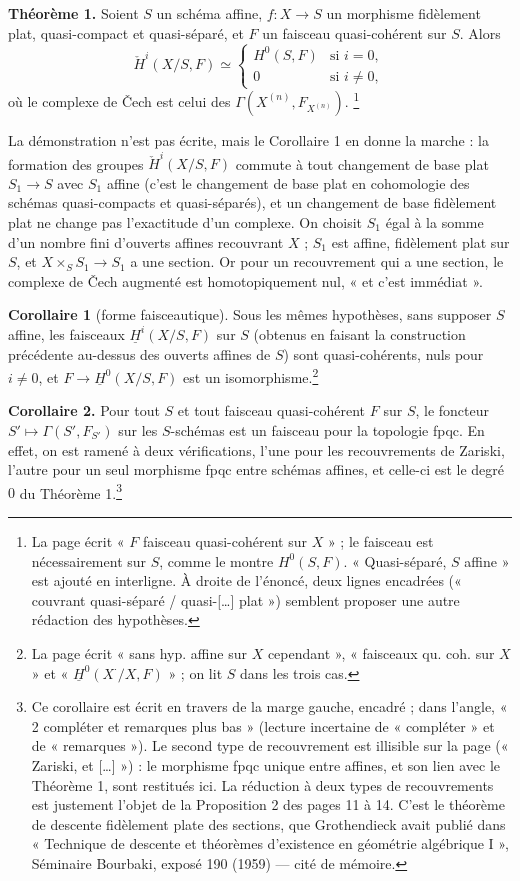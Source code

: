 \documentclass[11pt,a4paper]{article}
\begin{document}
\textbf{Théorème 1.} Soient $S$ un schéma affine, $f : X \to S$ un morphisme
fidèlement plat, quasi-compact et quasi-séparé, et $F$ un faisceau
quasi-cohérent sur $S$. Alors
\[
  \check{H}^i(X/S, F) \simeq
  \begin{cases}
    H^0(S, F) & \text{si } i = 0, \\
    0 & \text{si } i \neq 0 ,
  \end{cases}
\]
où le complexe de Čech est celui des $\Gamma(X^{(n)}, F_{X^{(n)}})$.%
\footnote{La page écrit « $F$ faisceau quasi-cohérent sur $X$ » ; le
faisceau est nécessairement sur $S$, comme le montre $H^0(S, F)$. « Quasi-séparé, $S$ affine » est ajouté en interligne. À droite de
l'énoncé, deux lignes encadrées (« couvrant quasi-séparé / quasi-[…] plat »)
semblent proposer une autre rédaction des hypothèses.}

La démonstration n'est pas écrite, mais le Corollaire 1 en donne la marche :
la formation des groupes $\check{H}^i(X/S, F)$ commute à tout changement de
base plat $S_1 \to S$ avec $S_1$ affine (c'est le changement de base plat en
cohomologie des schémas quasi-compacts et quasi-séparés), et un changement de
base fidèlement plat ne change pas l'exactitude d'un complexe. On choisit
$S_1$ égal à la somme d'un nombre fini d'ouverts affines recouvrant $X$ ;
$S_1$ est affine, fidèlement plat sur $S$, et $X \times_S S_1 \to S_1$ a une
section. Or pour un recouvrement qui a une section, le complexe de Čech
augmenté est homotopiquement nul, « et c'est immédiat ».

\textbf{Corollaire 1} (forme faisceautique). Sous les mêmes hypothèses, sans
supposer $S$ affine, les faisceaux $\underline{H}^i(X/S, F)$ sur $S$ (obtenus
en faisant la construction précédente au-dessus des ouverts affines de $S$)
sont quasi-cohérents, nuls pour $i \neq 0$, et $F \to \underline{H}^0(X/S, F)$
est un isomorphisme.\footnote{La page écrit « sans hyp. affine sur $X$ cependant »,
« faisceaux qu. coh. sur $X$ » et « $\underline{H}^0(X^{\cdot}/X, F)$ » ; on
lit $S$ dans les trois cas.}

\textbf{Corollaire 2.} Pour tout $S$ et tout faisceau quasi-cohérent $F$ sur
$S$, le foncteur $S' \mapsto \Gamma(S', F_{S'})$ sur les $S$-schémas est un
faisceau pour la topologie fpqc. En effet, on est ramené à deux
vérifications, l'une pour les recouvrements de Zariski, l'autre pour un seul
morphisme fpqc entre schémas affines, et celle-ci est le degré $0$ du
Théorème 1.\footnote{Ce corollaire est écrit en travers de la marge gauche,
encadré ; dans l'angle, « 2 compléter et remarques plus bas » (lecture
incertaine de « compléter » et de « remarques »). Le second type de
recouvrement est illisible sur la page (« Zariski, et […] ») : le morphisme
fpqc unique entre affines, et son lien avec le Théorème 1, sont restitués
ici. La réduction à deux types
de recouvrements est justement l'objet de la Proposition 2 des pages 11 à 14.
C'est le théorème de descente fidèlement plate des sections, que Grothendieck
avait publié dans « Technique de descente et théorèmes d'existence en
géométrie algébrique I », Séminaire Bourbaki, exposé 190 (1959) — cité de
mémoire.}
\end{document}
